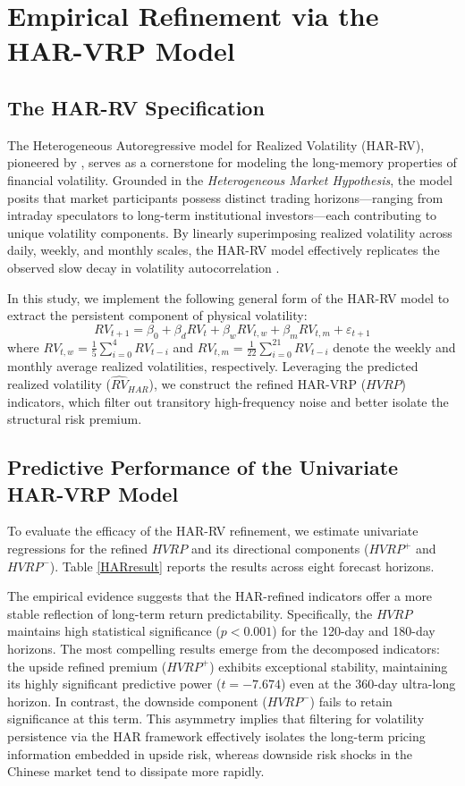 \documentclass[a4paper, 12pt]{article}    %
\begin{document}
\section{Empirical Refinement via the HAR-VRP Model}

\subsection{The HAR-RV Specification}
The Heterogeneous Autoregressive model for Realized Volatility (HAR-RV), pioneered by {\citep{corsi2012harmodeling}}, serves as a cornerstone for modeling the long-memory properties of financial volatility. Grounded in the \textit{Heterogeneous Market Hypothesis}, the model posits that market participants possess distinct trading horizons—ranging from intraday speculators to long-term institutional investors—each contributing to unique volatility components. By linearly superimposing realized volatility across daily, weekly, and monthly scales, the HAR-RV model effectively replicates the observed slow decay in volatility autocorrelation {\citep{andersen1998}}. 

In this study, we implement the following general form of the HAR-RV model to extract the persistent component of physical volatility:
\begin{equation}
RV_{t+1} = \beta_0 + \beta_d RV_t + \beta_w RV_{t,w} + \beta_m RV_{t,m} + \varepsilon_{t+1}
\end{equation}
where $RV_{t,w} = \frac{1}{5} \sum_{i=0}^{4} RV_{t-i}$ and $RV_{t,m} = \frac{1}{22} \sum_{i=0}^{21} RV_{t-i}$ denote the weekly and monthly average realized volatilities, respectively. Leveraging the predicted realized volatility ($\widehat{RV}_{HAR}$), we construct the refined HAR-VRP ($HVRP$) indicators, which filter out transitory high-frequency noise and better isolate the structural risk premium.

\subsection{Predictive Performance of the Univariate HAR-VRP Model}
To evaluate the efficacy of the HAR-RV refinement, we estimate univariate regressions for the refined $HVRP$ and its directional components ($HVRP^+$ and $HVRP^-$). Table \ref{HARresult} reports the results across eight forecast horizons. 

The empirical evidence suggests that the HAR-refined indicators offer a more stable reflection of long-term return predictability. Specifically, the $HVRP$ maintains high statistical significance ($p < 0.001$) for the 120-day and 180-day horizons. The most compelling results emerge from the decomposed indicators: the upside refined premium ($HVRP^+$) exhibits exceptional stability, maintaining its highly significant predictive power ($t = -7.674$) even at the 360-day ultra-long horizon. In contrast, the downside component ($HVRP^-$) fails to retain significance at this term. This asymmetry implies that filtering for volatility persistence via the HAR framework effectively isolates the long-term pricing information embedded in upside risk, whereas downside risk shocks in the Chinese market tend to dissipate more rapidly.
\end{document}

